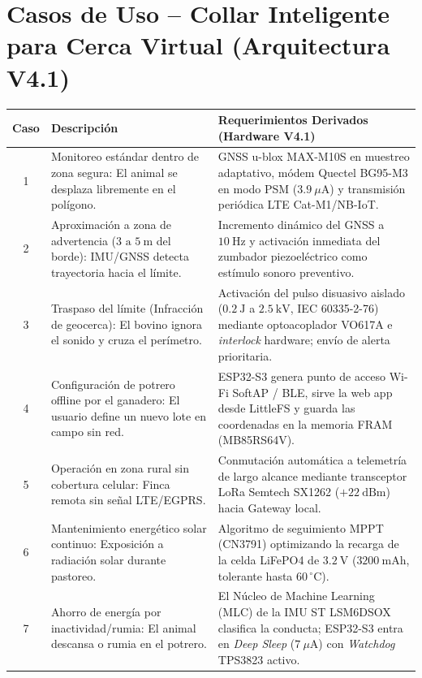 \section*{Casos de Uso -- Collar Inteligente para Cerca Virtual (Arquitectura V4.1)}

\begin{table}[H]
    \centering
    \small
    \renewcommand{\arraystretch}{1.3}
    \begin{tabularx}{\linewidth}{|c|X|X|}
        \hline
        \rowcolor{gray!20}
        \textbf{Caso} & \textbf{Descripción} & \textbf{Requerimientos Derivados (Hardware V4.1)} \\ \hline
        1 & Monitoreo estándar dentro de zona segura: El animal se desplaza libremente en el polígono. & GNSS u-blox MAX-M10S en muestreo adaptativo, módem Quectel BG95-M3 en modo PSM ($3.9~\mu\text{A}$) y transmisión periódica LTE Cat-M1/NB-IoT. \\ \hline
        2 & Aproximación a zona de advertencia ($3\text{ a }5~\text{m}$ del borde): IMU/GNSS detecta trayectoria hacia el límite. & Incremento dinámico del GNSS a $10~\text{Hz}$ y activación inmediata del zumbador piezoeléctrico como estímulo sonoro preventivo. \\ \hline
        3 & Traspaso del límite (Infracción de geocerca): El bovino ignora el sonido y cruza el perímetro. & Activación del pulso disuasivo aislado ($0.2~\text{J}$ a $2.5~\text{kV}$, IEC 60335-2-76) mediante optoacoplador VO617A e \textit{interlock} hardware; envío de alerta prioritaria. \\ \hline
        4 & Configuración de potrero offline por el ganadero: El usuario define un nuevo lote en campo sin red. & ESP32-S3 genera punto de acceso Wi-Fi SoftAP / BLE, sirve la web app desde LittleFS y guarda las coordenadas en la memoria FRAM (MB85RS64V). \\ \hline
        5 & Operación en zona rural sin cobertura celular: Finca remota sin señal LTE/EGPRS. & Conmutación automática a telemetría de largo alcance mediante transceptor LoRa Semtech SX1262 ($+22~\text{dBm}$) hacia Gateway local. \\ \hline
        6 & Mantenimiento energético solar continuo: Exposición a radiación solar durante pastoreo. & Algoritmo de seguimiento MPPT (CN3791) optimizando la recarga de la celda LiFePO4 de $3.2~\text{V}$ ($3200~\text{mAh}$, tolerante hasta $60\,^\circ\text{C}$). \\ \hline
        7 & Ahorro de energía por inactividad/rumia: El animal descansa o rumia en el potrero. & El Núcleo de Machine Learning (MLC) de la IMU ST LSM6DSOX clasifica la conducta; ESP32-S3 entra en \textit{Deep Sleep} ($7~\mu\text{A}$) con \textit{Watchdog} TPS3823 activo. \\ \hline

\end{tabularx}
\end{table}
